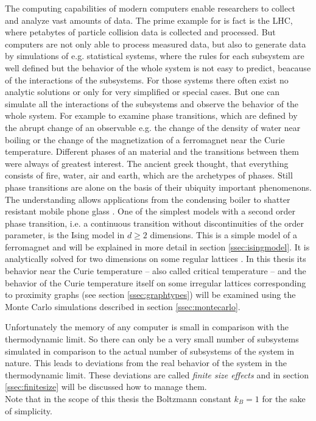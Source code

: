The computing capabilities of modern computers enable researchers to
collect and analyze vast amounts of data. The prime example for is fact
is the LHC, where petabytes of particle collision data is collected and
processed. But computers are not only able to process measured data, but
also to generate data by simulations of e.g. statistical systems, where
the rules for each subsystem are well defined but the behavior of the
whole system is not easy to predict, beacause of the interactions of the
subsystems. For those systems there often exist no analytic solutions
or only for very simplified or special cases. But one can simulate all
the interactions of the subsystems and observe the behavior of the whole
system.
For example to examine phase transitions, which are defined by the abrupt
change of an observable e.g. the change of the density of water near
boiling or the change of the magnetization of a ferromagnet near the
Curie temperature.
Different phases of an material and the transitions between them were
always of greatest interest. The ancient greek thought, that everything
consists of fire, water, air and earth, which are the archetypes of
phases. Still phase transitions are alone on the basis of their ubiquity
important phenomenons. The understanding allows applications from the
condensing boiler to shatter resistant mobile phone glass \cite{PJournalGlass}.
One of the simplest models with a second order
phase transition, i.e. a continuous transition without discontinuities of
the order parameter, is the Ising model \cite{Ising1925} in \(d \ge 2\)
dimensions. This is a simple
model of a ferromagnet and will be explained in more detail in section
\ref{ssec:isingmodel}. It is analytically solved for two dimensions on
some regular lattices \cite{Onsager1944} \cite{Wannier1945}.
In this thesis its behavior near the Curie temperature -- also called
critical temperature -- and the behavior of the Curie temperature itself
on some irregular lattices corresponding to proximity graphs
(see section \ref{ssec:graphtypes}) will be examined using the Monte
Carlo simulations described in section \ref{ssec:montecarlo}.

Unfortunately the memory of any computer is small in comparison with the
thermodynamic limit. So there can only be a very small number of
subsystems simulated in comparison to the actual number of subsystems
of the system in nature. This leads to deviations from the real behavior
of the system in the thermodynamic limit. These deviations are called
\emph{finite size effects} and in section \ref{ssec:finitesize} will be
discussed how to manage them.\\

Note that in the scope of this thesis the Boltzmann constant \(k_{B}=1\)
for the sake of simplicity.

